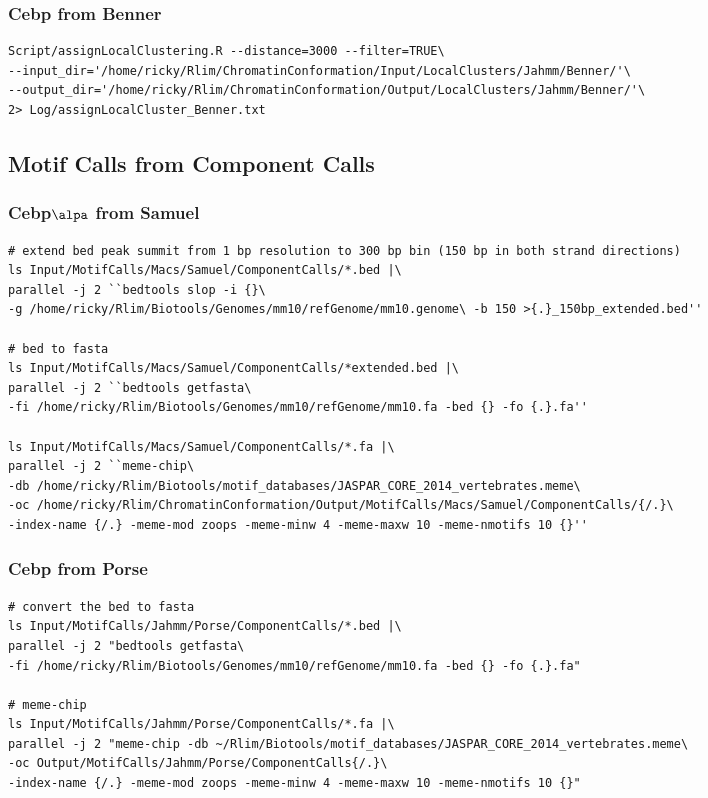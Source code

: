 \documentclass{article}\usepackage[]{graphicx}\usepackage[]{color}
\begin{document}
\subsubsection{Cebp from Benner}
\begin{verbatim}
Script/assignLocalClustering.R --distance=3000 --filter=TRUE\ 
--input_dir='/home/ricky/Rlim/ChromatinConformation/Input/LocalClusters/Jahmm/Benner/'\ 
--output_dir='/home/ricky/Rlim/ChromatinConformation/Output/LocalClusters/Jahmm/Benner/'\ 
2> Log/assignLocalCluster_Benner.txt

\end{verbatim}

\subsection{Motif Calls from Component Calls}
\subsubsection{Cebp$\alpa$ from Samuel}

\begin{verbatim}
# extend bed peak summit from 1 bp resolution to 300 bp bin (150 bp in both strand directions)
ls Input/MotifCalls/Macs/Samuel/ComponentCalls/*.bed |\ 
parallel -j 2 ``bedtools slop -i {}\ 
-g /home/ricky/Rlim/Biotools/Genomes/mm10/refGenome/mm10.genome\ -b 150 >{.}_150bp_extended.bed''

# bed to fasta
ls Input/MotifCalls/Macs/Samuel/ComponentCalls/*extended.bed |\ 
parallel -j 2 ``bedtools getfasta\ 
-fi /home/ricky/Rlim/Biotools/Genomes/mm10/refGenome/mm10.fa -bed {} -fo {.}.fa''

ls Input/MotifCalls/Macs/Samuel/ComponentCalls/*.fa |\ 
parallel -j 2 ``meme-chip\ 
-db /home/ricky/Rlim/Biotools/motif_databases/JASPAR_CORE_2014_vertebrates.meme\ 
-oc /home/ricky/Rlim/ChromatinConformation/Output/MotifCalls/Macs/Samuel/ComponentCalls/{/.}\ 
-index-name {/.} -meme-mod zoops -meme-minw 4 -meme-maxw 10 -meme-nmotifs 10 {}''

\end{verbatim}

\subsubsection{Cebp from Porse}
\begin{verbatim}
# convert the bed to fasta
ls Input/MotifCalls/Jahmm/Porse/ComponentCalls/*.bed |\ 
parallel -j 2 "bedtools getfasta\ 
-fi /home/ricky/Rlim/Biotools/Genomes/mm10/refGenome/mm10.fa -bed {} -fo {.}.fa"

# meme-chip
ls Input/MotifCalls/Jahmm/Porse/ComponentCalls/*.fa |\ 
parallel -j 2 "meme-chip -db ~/Rlim/Biotools/motif_databases/JASPAR_CORE_2014_vertebrates.meme\ 
-oc Output/MotifCalls/Jahmm/Porse/ComponentCalls{/.}\ 
-index-name {/.} -meme-mod zoops -meme-minw 4 -meme-maxw 10 -meme-nmotifs 10 {}"
\end{verbatim}
\end{document}
